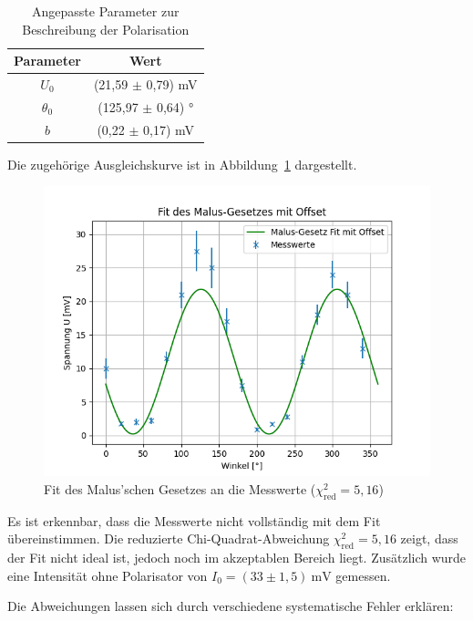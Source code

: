 \begin{table}[htbp]
    \centering
    \begin{tabular}{c|c}
        Parameter & Wert \\
        \hline
        $U_0$ & (21{,}59 \(\pm\) 0{,}79) mV \\
        $\theta_0$ & (125{,}97 \(\pm\) 0{,}64) ° \\
        $b$ & (0{,}22 \(\pm\) 0{,}17) mV \\
    \end{tabular}
    \caption{Angepasste Parameter zur Beschreibung der Polarisation}
    \label{tab:WertePol}
\end{table}

Die zugehörige Ausgleichskurve ist in Abbildung~\ref{fig:PolarisationFigur} dargestellt.

\begin{figure}[H]
    \centering
    \includegraphics[width=1\linewidth]{figs/Figure_2}
    \caption{Fit des Malus’schen Gesetzes an die Messwerte ($\chi^2_\text{red} = 5{,}16$)}
    \label{fig:PolarisationFigur}
\end{figure}

Es ist erkennbar, dass die Messwerte nicht vollständig mit dem Fit übereinstimmen.
Die reduzierte Chi-Quadrat-Abweichung $\chi^2_\text{red} = 5{,}16$ zeigt, dass der Fit nicht ideal ist, jedoch noch im akzeptablen Bereich liegt. 
Zusätzlich wurde eine Intensität ohne Polarisator von $I_0 = (33 \pm 1{,}5)~\text{mV}$ gemessen.

Die Abweichungen lassen sich durch verschiedene systematische Fehler erklären:

